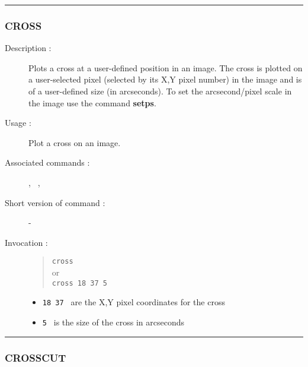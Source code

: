 \hrule
\subsubsection*{\label{CROSS}CROSS}

\begin{description}

\item [Description :] Plots a cross at a user-defined position in an
image.  The cross is plotted on a user-selected pixel (selected by its
X,Y pixel number) in the image and is of a user-defined size (in
arcseconds).  To set the arcsecond/pixel scale in the image use the
command {\bf setps}.

\item[Usage :] Plot a cross on an image.

\item[Associated commands :] {\tt {}}, {\tt
{}}, {\tt {}}

\item[Short version of command :] -

\item[Invocation :]

\begin{quote}{\tt  cross }\\
or \\
{\tt cross 18 37 5 }
\end{quote}

\begin{itemize}

\item {\tt 18 37 } are the X,Y pixel coordinates for the cross
\item {\tt 5 } is the size of the cross in arcseconds
\end{itemize}

\end{description}

\hrule
\subsubsection*{\label{CROSSCUT}CROSSCUT}

